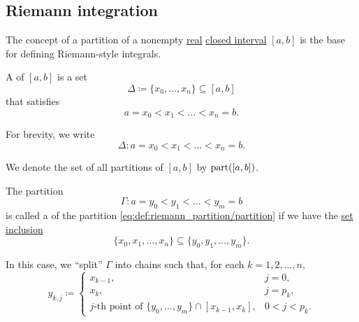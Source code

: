 \subsection{Riemann integration}\label{subsec:riemann_integration}

\begin{definition}\label{def:riemann_partition}\mcite\cite[def. 1]{Gordon1991}
  The concept of a partition of a nonempty \hyperref[def:real_numbers]{real} \hyperref[def:total_order_interval/closed]{closed interval} \( [a, b] \) is the base for defining Riemann-style integrals.

  \begin{thmenum}
     A  of \( [a, b] \) is a set
    \begin{equation*}
      \Delta \coloneqq \{ x_0, \ldots, x_n \} \subseteq [a, b]
    \end{equation*}
    that satisfies
    \begin{equation*}
      a = x_0 < x_1 < \ldots < x_n = b.
    \end{equation*}

    For brevity, we write
    \begin{equation}\label{eq:def:riemann_partition/partition}
      \Delta: a = x_0 < x_1 < \ldots < x_n = b.
    \end{equation}

    We denote the set of all partitions of \( [a, b] \) by \( \operatorname{part}([a, b]) \).

     The partition
    \begin{equation*}
      \Gamma: a = y_0 < y_1 < \ldots < y_m = b
    \end{equation*}
    is called a  of the partition \eqref{eq:def:riemann_partition/partition} if we have the \hyperref[def:subset]{set inclusion}
    \begin{equation}\label{eq:def:riemann_partition/refinement/inclusion}
      \{ x_0, x_1, \ldots, x_n \} \subseteq \{ y_0, y_1, \ldots, y_m \}.
    \end{equation}

    In this case, we \enquote{split} \( \Gamma \) into chains such that, for each \( k = 1, 2, \ldots, n \),
    \begin{equation}\label{def:riemann_partition/refinement/splitting}
      y_{k,j} \coloneqq \begin{cases}
        x_{k-1},                                                                          &j = 0, \\
        x_k,                                                                              &j = p_k, \\
        j\text{-th point of } \{ y_0, \ldots, y_m \} \cap [x_{k-1}, x_k], &0 < j < p_k.
      \end{cases}
    \end{equation}


\end{thmenum}
\end{definition}
